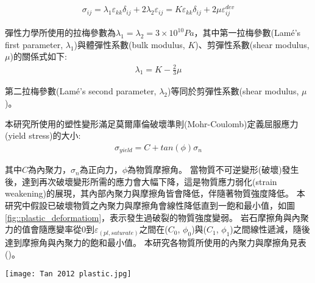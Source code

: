 \begin{align}
    \sigma_{ij}=\lambda_1 \varepsilon_{kk} \delta_{ij}+2 \lambda_2 \varepsilon_{ij}=K\varepsilon_{kk} \delta_{ij}+2 \mu \varepsilon_{ij}^{dev} \label{eqn:elastic tensor}
\end{align}

彈性力學所使用的拉梅參數為$\lambda_1 = \lambda_2 = 3 \times 10^{10} Pa$，其中第一拉梅參數(Lamé's first parameter, $\lambda_1$)與體彈性系數(bulk modulus, $K$)、剪彈性系數(shear modulus, $\mu$)的關係式如下:
\begin{align}
\lambda_1 = K - \frac{2}{3}\mu
\end{align}

第二拉梅參數(Lamé's second parameter, $\lambda_2$)等同於剪彈性系數(shear modulus, $\mu$)。

本研究所使用的塑性變形滿足莫爾庫倫破壞準則(Mohr-Coulomb)定義屈服應力(yield stress)的大小:
\begin{align}
    \sigma_{yield}=C+tan(\phi)\sigma_{n}\label{eqn:plastic deformation}
\end{align}

其中$C$為內聚力，$\sigma_n$為正向力，$\phi$為物質摩擦角。
當物質不可逆變形(破壞)發生後，達到再次破壞變形所需的應力會大幅下降，這是物質應力弱化(strain weakening)的展現，其內部內聚力與摩擦角皆會降低，伴隨著物質強度降低。
本研究中假設已破壞物質之內聚力與摩擦角會線性降低直到一飽和最小值，如圖\ref{fig::plastic_deformatiom}，表示發生過破裂的物質強度變弱。
岩石摩擦角與內聚力的值會隨應變率從0到$\varepsilon_(pl,saturate)$之間在($C_0$, $\phi_0$)與($C_1$, $\phi_1$)之間線性遞減，隨後達到摩擦角與內聚力的飽和最小值。
本研究各物質所使用的內聚力與摩擦角見表()。
\begin{figure*}[ht!]
    \centering
    \texttt{[image: Tan 2012 plastic.jpg]}
    \caption[應力弱化示意圖，摘自\citealp{Tan2012}。]{應力弱化示意圖，摘自\citealp{Tan2012}。在應變率為$0$時，岩石摩擦角與內聚力分別為$C_0$, $\phi_0$ ; 在應變率大於$\varepsilon_(pl,saturate)$時，岩石摩擦角與內聚力分別為$C_1$, $\phi_1$。摩擦角與內聚力的值會隨應變率變化在($C_0$, $\phi_0$)與($C_1$, $\phi_1$)之間線性遞減。
    }
    \label{fig::plastic_deformatiom}
\end{figure*}

